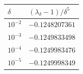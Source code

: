 \begin{center}
\begin{tabular}{@{}ll@{}}
\toprule
\(\delta\) & \((\lambda_\delta-1)/\delta^5\)\\
\midrule
\(10^{-2}\) & \(-0.1248207361\)\\
\(10^{-3}\) & \(-0.1249833498\)\\
\(10^{-4}\) & \(-0.1249983476\)\\
\(10^{-5}\) & \(-0.1249998349\)\\
\bottomrule
\end{tabular}
\end{center}
